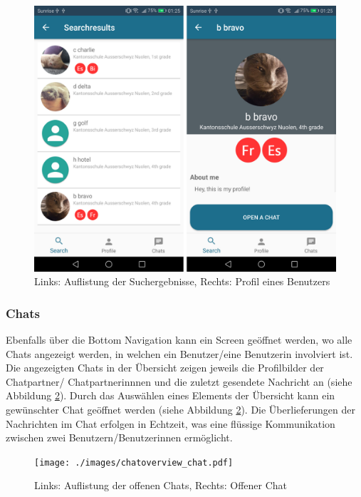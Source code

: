 \documentclass[../main.tex]{subfiles}
\begin{document}
\begin{figure} 
	\centering
	\includegraphics[width=\textwidth]{./images/searchresults_userprofile.pdf}
	\caption{Links: Auflistung der Suchergebnisse, Rechts: Profil eines Benutzers}
	\label{results_profile}
\end{figure}

\subsubsection*{Chats}
Ebenfalls über die Bottom Navigation kann ein Screen geöffnet werden, wo alle Chats angezeigt werden, in welchen ein Benutzer/eine Benutzerin involviert ist. Die angezeigten Chats in der Übersicht zeigen jeweils die Profilbilder der Chatpartner/ Chatpartnerinnnen und die zuletzt gesendete Nachricht an (siehe Abbildung \ref{chat}). Durch das Auswählen eines Elements der Übersicht kann ein gewünschter Chat geöffnet werden (siehe Abbildung \ref{chat}). Die Überlieferungen der Nachrichten im Chat erfolgen in Echtzeit, was eine flüssige Kommunikation zwischen zwei Benutzern/Benutzerinnen ermöglicht.

\begin{figure} 
	\centering
	\texttt{[image: ./images/chatoverview\_chat.pdf]}
	\caption{Links: Auflistung der offenen Chats, Rechts: Offener Chat}
	\label{chat}
\end{figure}
\end{document}
